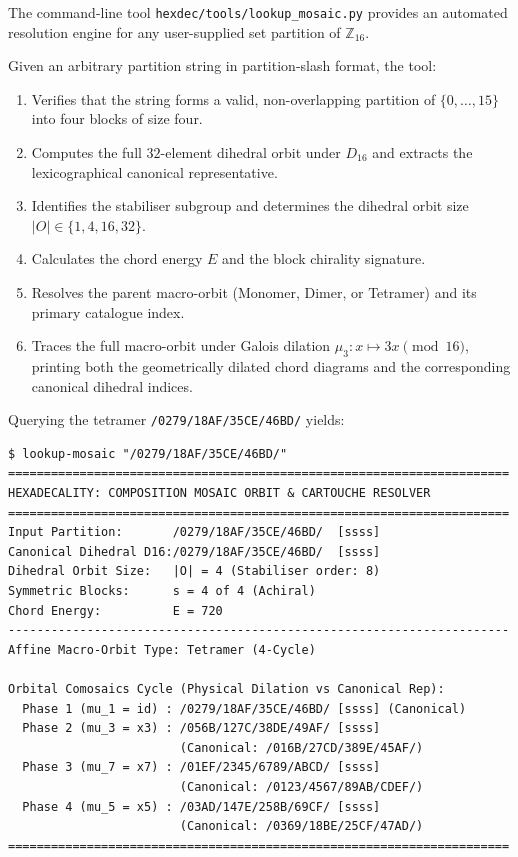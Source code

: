 The command-line tool \texttt{hexdec/tools/lookup\_mosaic.py} provides an automated resolution engine for any user-supplied set partition of $\mathbb{Z}_{16}$. 

Given an arbitrary partition string in partition-slash format, the tool:
\begin{enumerate}
    \item Verifies that the string forms a valid, non-overlapping partition of $\{0, \dots, 15\}$ into four blocks of size four.
    \item Computes the full $32$-element dihedral orbit under $D_{16}$ and extracts the lexicographical canonical representative.
    \item Identifies the stabiliser subgroup and determines the dihedral orbit size $|O| \in \{1, 4, 16, 32\}$.
    \item Calculates the chord energy $E$ and the block chirality signature.
    \item Resolves the parent macro-orbit (Monomer, Dimer, or Tetramer) and its primary catalogue index.
    \item Traces the full macro-orbit under Galois dilation $\mu_3 \colon x \mapsto 3x \pmod{16}$, printing both the geometrically dilated chord diagrams and the corresponding canonical dihedral indices.
\end{enumerate}

\begin{example}
Querying the tetramer \texttt{/0279/18AF/35CE/46BD/} yields:
{\small
\begin{verbatim}
$ lookup-mosaic "/0279/18AF/35CE/46BD/"
======================================================================
HEXADECALITY: COMPOSITION MOSAIC ORBIT & CARTOUCHE RESOLVER
======================================================================
Input Partition:       /0279/18AF/35CE/46BD/  [ssss]
Canonical Dihedral D16:/0279/18AF/35CE/46BD/  [ssss]
Dihedral Orbit Size:   |O| = 4 (Stabiliser order: 8)
Symmetric Blocks:      s = 4 of 4 (Achiral)
Chord Energy:          E = 720
----------------------------------------------------------------------
Affine Macro-Orbit Type: Tetramer (4-Cycle)

Orbital Comosaics Cycle (Physical Dilation vs Canonical Rep):
  Phase 1 (mu_1 = id) : /0279/18AF/35CE/46BD/ [ssss] (Canonical)
  Phase 2 (mu_3 = x3) : /056B/127C/38DE/49AF/ [ssss]
                        (Canonical: /016B/27CD/389E/45AF/)
  Phase 3 (mu_7 = x7) : /01EF/2345/6789/ABCD/ [ssss]
                        (Canonical: /0123/4567/89AB/CDEF/)
  Phase 4 (mu_5 = x5) : /03AD/147E/258B/69CF/ [ssss]
                        (Canonical: /0369/18BE/25CF/47AD/)
======================================================================
\end{verbatim}}
\end{example}

